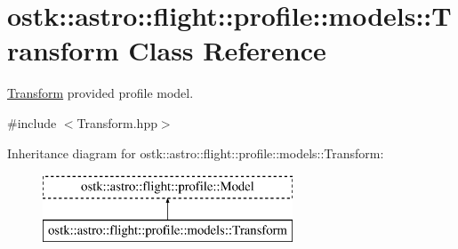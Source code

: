 \hypertarget{classostk_1_1astro_1_1flight_1_1profile_1_1models_1_1_transform}{}\section{ostk\+:\+:astro\+:\+:flight\+:\+:profile\+:\+:models\+:\+:Transform Class Reference}
\label{classostk_1_1astro_1_1flight_1_1profile_1_1models_1_1_transform}


\hyperlink{classostk_1_1astro_1_1flight_1_1profile_1_1models_1_1_transform}{Transform} provided profile model.  




{\ttfamily \#include $<$Transform.\+hpp$>$}

Inheritance diagram for ostk\+:\+:astro\+:\+:flight\+:\+:profile\+:\+:models\+:\+:Transform\+:\begin{figure}[H]
\begin{center}
\leavevmode
\includegraphics[height=2.000000cm]{classostk_1_1astro_1_1flight_1_1profile_1_1models_1_1_transform}
\end{center}
\end{figure}
